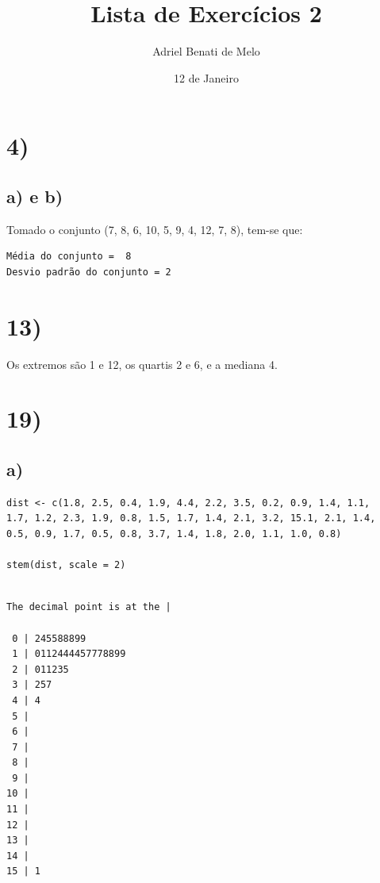 \documentclass[11pt]{article}
\author{Adriel Benati de Melo}
\date{12 de Janeiro}
\title{Lista de Exercícios 2}
\begin{document}
\maketitle

\section*{4)}
\label{sec:orgcd07a13}

\subsection*{a) e b)}
\label{sec:org6e8c663}

Tomado o conjunto (7, 8, 6, 10, 5, 9, 4, 12, 7, 8), tem-se que:

\begin{verbatim}
Média do conjunto =  8
Desvio padrão do conjunto = 2
\end{verbatim}

\section*{13)}
\label{sec:orgbeb687d}

Os extremos são 1 e 12, os quartis 2 e 6, e a mediana 4.

\section*{19)}
\label{sec:orgb2fd997}

\subsection*{a)}
\label{sec:org1ca2407}

\begin{verbatim}
dist <- c(1.8, 2.5, 0.4, 1.9, 4.4, 2.2, 3.5, 0.2, 0.9, 1.4, 1.1,
1.7, 1.2, 2.3, 1.9, 0.8, 1.5, 1.7, 1.4, 2.1, 3.2, 15.1, 2.1, 1.4,
0.5, 0.9, 1.7, 0.5, 0.8, 3.7, 1.4, 1.8, 2.0, 1.1, 1.0, 0.8)

stem(dist, scale = 2)
\end{verbatim}

\begin{verbatim}

The decimal point is at the |

 0 | 245588899
 1 | 0112444457778899
 2 | 011235
 3 | 257
 4 | 4
 5 | 
 6 | 
 7 | 
 8 | 
 9 | 
10 | 
11 | 
12 | 
13 | 
14 | 
15 | 1

\end{verbatim}
\end{document}
